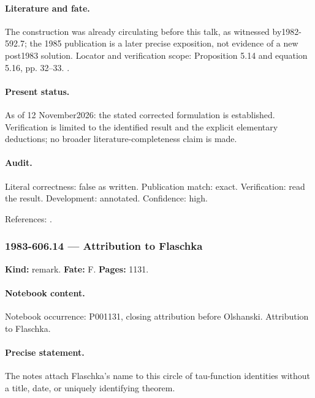 \paragraph{Literature and fate.} The construction was already circulating before this talk, as witnessed by1982-592.7; the 1985 publication is a later precise exposition, not evidence of a new post1983 solution. Locator and verification scope: Proposition 5.14 and equation 5.16, pp. 32--33. \cite{segalwilson1985loop}.

\paragraph{Present status.} As of 12 November2026: the stated corrected formulation is established. Verification is limited to the identified result and the explicit elementary deductions; no broader literature-completeness claim is made.

\paragraph{Audit.} Literal correctness: false as written. Publication match: exact. Verification: read the result. Development: annotated. Confidence: high.

\noindent References: \citep{segalwilson1985loop}.\par

\subsubsection{1983-606.14 --- Attribution to Flaschka}

\label{item:1983-606.14}

\noindent\textbf{Kind:} remark. \textbf{Fate:} F. \textbf{Pages:} 1131.\par

\paragraph{Notebook content.} Notebook occurrence: P001131, closing attribution before Olshanski. Attribution to Flaschka.

\paragraph{Precise statement.} The notes attach Flaschka's name to this circle of tau-function identities without a title, date, or uniquely identifying theorem.

